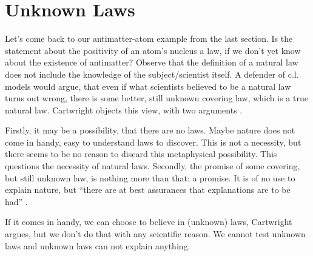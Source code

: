 \section*{Unknown Laws}
Let's come back to our antimatter-atom example from the last section.
Is the statement about the positivity of an atom's nucleus a law,
if we don't yet know about the existence of antimatter?
Observe that the definition
of a natural law does not include the knowledge of the subject/scientist itself.
A defender of c.l. models would argue, that even if what scientists believed to be a
natural law turns out wrong, there is some better, still unknown covering law, which is a true
natural law.
Cartwright objects this view, with two arguments \cite[5]{cartwright1980truth}.

Firstly, it may be a possibility, that there are no laws.
Maybe nature does not come in handy, easy to understand laws to discover.
This is not a necessity, but there seems to be no reason to discard this
metaphysical possibility.
This questions the necessity of natural laws.
Secondly, the promise of some covering, but still unknown law, is
nothing more than that: a promise. It is of no use to explain
nature, but \enquote{there are at best assurances that explanations are to be had} \cite[5]{cartwright1980truth}.

If it comes in handy, we can choose to believe in (unknown) laws, Cartwright argues, but
we don't do that with any scientific reason.
We cannot test unknown laws and unknown laws can not explain anything.



